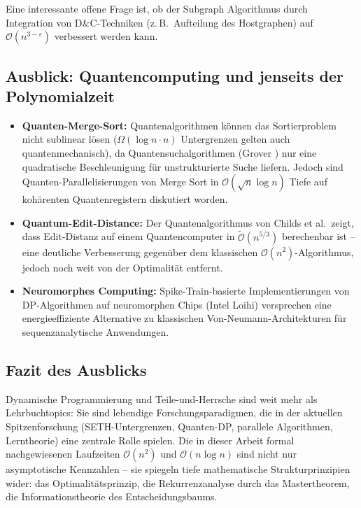 ﻿\documentclass[a4paper,12pt]{article}
\theoremstyle{definition}
\begin{document}
Eine interessante offene Frage ist, ob der Subgraph Algorithmus durch
Integration von D\&C-Techniken (z.\,B.\ Aufteilung des Hostgraphen) auf
$\mathcal{O}(n^{3-\varepsilon})$ verbessert werden kann.

\subsection{Ausblick: Quantencomputing und jenseits der Polynomialzeit}

\begin{itemize}
    \item \textbf{Quanten-Merge-Sort:} Quantenalgorithmen können das Sortierproblem
          nicht sublinear lösen ($\Omega(\log n \cdot n)$ Untergrenzen gelten auch
          quantenmechanisch), da Quantensuchalgorithmen (Grover \cite{grover1996})
          nur eine quadratische Beschleunigung für unstrukturierte Suche liefern.
          Jedoch sind Quanten-Parallelisierungen von Merge Sort in
          $\mathcal{O}(\sqrt{n} \log n)$ Tiefe auf kohärenten Quantenregistern
          diskutiert worden.
    \item \textbf{Quantum-Edit-Distance:} Der Quantenalgorithmus von Childs et al.\
          zeigt, dass Edit-Distanz auf einem Quantencomputer in
          $\tilde{\mathcal{O}}(n^{5/3})$ berechenbar ist -- eine deutliche
          Verbesserung gegenüber dem klassischen $\mathcal{O}(n^2)$-Algorithmus,
          jedoch noch weit von der Optimalität entfernt.
    \item \textbf{Neuromorphes Computing:} Spike-Train-basierte Implementierungen
          von DP-Algorithmen auf neuromorphen Chips (Intel Loihi) versprechen eine
          energieeffiziente Alternative zu klassischen Von-Neumann-Architekturen
          für sequenzanalytische Anwendungen.
\end{itemize}

\subsection{Fazit des Ausblicks}

Dynamische Programmierung und Teile-und-Herrsche sind weit mehr als Lehrbuchtopics:
Sie sind lebendige Forschungsparadigmen, die in der aktuellen Spitzenforschung
(SETH-Untergrenzen, Quanten-DP, parallele Algorithmen, Lerntheorie) eine zentrale
Rolle spielen. Die in dieser Arbeit formal nachgewiesenen Laufzeiten $\mathcal{O}(n^2)$
und $\mathcal{O}(n \log n)$ sind nicht nur asymptotische Kennzahlen -- sie spiegeln
tiefe mathematische Strukturprinzipien wider: das Optimalitätsprinzip, die
Rekurrenzanalyse durch das Mastertheorem, die Informationstheorie des Entscheidungsbaums.
\end{document}
